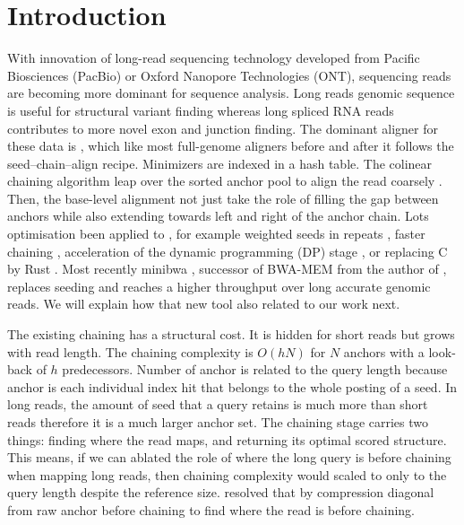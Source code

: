 \section{Introduction}

With innovation of long-read sequencing technology developed from Pacific Biosciences (PacBio) or Oxford Nanopore Technologies (ONT), sequencing reads are becoming more dominant for sequence analysis. Long reads genomic sequence is useful for structural variant finding whereas long spliced RNA reads contributes to more novel exon and junction finding. The dominant aligner for these data is \mmtwo{} \citep{li2018minimap2}, which like most full-genome aligners before and after it \citep{chaisson2012blasr,sedlazeck2018ngmlr,jain2020winnowmap,jain2022winnowmap2,ren2021lra,li2026minibwa,wang2026rammap} follows the seed--chain--align recipe. Minimizers \citep{roberts2004minimizers} are indexed in a hash table. The colinear chaining algorithm leap over the sorted anchor pool to align the read coarsely \citep{li2018minimap2}. Then, the base-level alignment \citep{suzuki2018difference} not just take the role of filling the gap between anchors while also extending towards left and right of the anchor chain. Lots optimisation been applied to \mmtwo{}, for example weighted seeds in repeats \citep{jain2020winnowmap,jain2022winnowmap2}, faster chaining \citep{li2021accuracy,kalikar2022mm2fast,chandra2024accelerating}, acceleration of the dynamic programming (DP) stage \citep{suzuki2018difference,kalikar2022mm2fast}, or replacing C by Rust \citep{wang2026rammap}. Most recently minibwa \citep{li2026minibwa}, successor of BWA-MEM from the author of \mmtwo{}, replaces \mmtwo{} seeding and reaches a higher throughput over long accurate genomic reads. We will explain how that new tool also related to our work next.

The existing chaining has a structural cost. It is hidden for short reads but grows with read length. The chaining complexity is $O(hN)$ for $N$ anchors with a look-back of $h$ predecessors. Number of anchor is related to the query length because anchor is each individual index hit that belongs to the whole posting of a seed. In long reads, the amount of seed that a query retains is much more than short reads therefore it is a much larger anchor set. The chaining stage carries two things: finding where the read maps, and returning its optimal scored structure. This means, if we can ablated the role of where the long query is before chaining when mapping long reads, then chaining complexity would scaled to only to the query length despite the reference size. \flash{} resolved that by compression diagonal from raw anchor before chaining to find where the read is before chaining.

